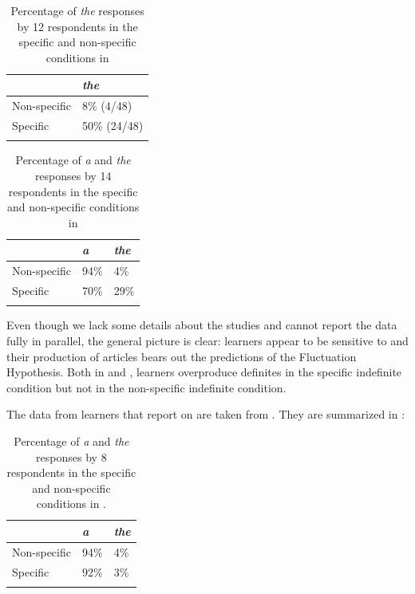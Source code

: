 \documentclass[output=paper,
modfonts
]{langscibook}
\begin{document}
\begin{table}[h]
\begin{tabularx}{.5\textwidth}{XX}
\lsptoprule
 &  \textit{the} \\
\midrule
Non-specific & 8\% (4/48) \\
Specific & 50\% (24/48) \\
\lspbottomrule
\end{tabularx}
\caption{Percentage of \textit{the} responses by 12  respondents in the specific and non-specific conditions in \citet{Hawkinsetal2006}}
\label{tab:lebruyn:3}
\end{table}

\begin{table}[h]
\begin{tabularx}{.66\textwidth}{lXX}
\lsptoprule
 & \textit{a} & \textit{the} \\
\midrule
{Non-specific} & 94\% & 4\%  \\
Specific & 70\% & 29\% \\
\lspbottomrule
\end{tabularx}
\caption{Percentage of \textit{a} and \textit{the} responses by 14  respondents in the specific and non-specific conditions in \citet{Reidetal2006}}
\label{tab:lebruyn:4}
\end{table}
\newpage
Even though we lack some details about the studies and cannot report the data fully in parallel, the general picture is clear:  learners appear to be sensitive to  and their production of  articles bears out the predictions of the Fluctuation Hypothesis. Both in \citet{Hawkinsetal2006} and \citet{Reidetal2006},  learners overproduce definites in the specific indefinite condition but not in the non-specific indefinite condition.

The data from  learners that \citet{SnapeLeungTing2006} report on are taken from \citet{Ting2005}. They are summarized in :

\begin{table}[h]
\begin{tabularx}{.66\textwidth}{lXX}
\lsptoprule
 & \textit{a} & \textit{the} \\
\midrule
Non-specific & 94\% & 4\%  \\
Specific & 92\% & 3\% \\
\lspbottomrule
\end{tabularx}
\caption{Percentage of \textit{a} and \textit{the} responses by 8  respondents in the specific and non-specific conditions in \citet{Ting2005}.}
\label{tab:lebruyn:5}
\end{table}
\end{document}
